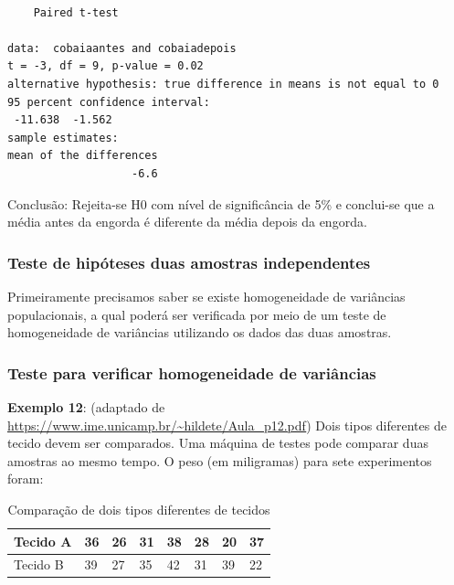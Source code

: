 \documentclass[12pt,brazil,oneside]{book}
\begin{document}
\begin{verbatim}

    Paired t-test

data:  cobaiaantes and cobaiadepois
t = -3, df = 9, p-value = 0.02
alternative hypothesis: true difference in means is not equal to 0
95 percent confidence interval:
 -11.638  -1.562
sample estimates:
mean of the differences 
                   -6.6 
\end{verbatim}

Conclusão: Rejeita-se H0 com nível de significância de 5\% e conclui-se
que a média antes da engorda é diferente da média depois da engorda.

\hypertarget{teste-de-hipoteses-duas-amostras-independentes}{%
\subsubsection{Teste de hipóteses duas amostras
independentes}\label{teste-de-hipoteses-duas-amostras-independentes}}

Primeiramente precisamos saber se existe homogeneidade de variâncias
populacionais, a qual poderá ser verificada por meio de um teste de
homogeneidade de variâncias utilizando os dados das duas amostras.

\hypertarget{teste-para-verificar-homogeneidade-de-variancias}{%
\subsubsection{Teste para verificar homogeneidade de
variâncias}\label{teste-para-verificar-homogeneidade-de-variancias}}

\textbf{Exemplo 12}: (adaptado de
\url{https://www.ime.unicamp.br/~hildete/Aula_p12.pdf}) Dois tipos
diferentes de tecido devem ser comparados. Uma máquina de testes pode
comparar duas amostras ao mesmo tempo. O peso (em miligramas) para sete
experimentos foram:

\begin{table}

\caption{\label{tab:unnamed-chunk-112}Comparação de dois tipos diferentes de tecidos}
\centering
\begin{tabular}[t]{l|l|l|l|l|l|l|l}
\hline
Tecido A & 36 & 26 & 31 & 38 & 28 & 20 & 37\\
\hline
Tecido B & 39 & 27 & 35 & 42 & 31 & 39 & 22\\
\hline
\end{tabular}
\end{table}
\end{document}
